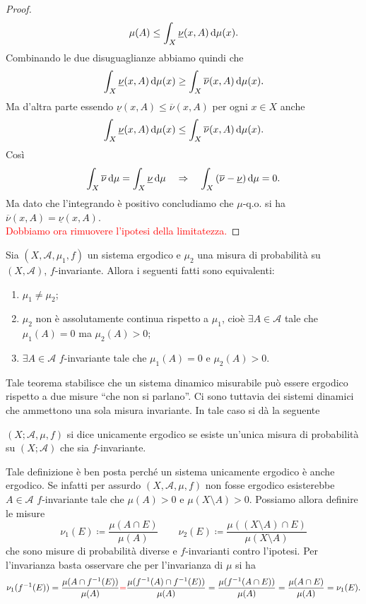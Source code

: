 \begin{proof}
    \[
        \mu(A) \leq \int_{X}\underline{\nu}(x, A) \dif{\mu}(x).
    \]
    Combinando le due disuguaglianze abbiamo quindi che
    \[
        \int_{X}\underline{\nu}(x, A) \dif{\mu}(x) \geq \int_{X}\overline{\nu}(x, A) \dif{\mu}(x).
    \]
    Ma d'altra parte essendo $ \underline{\nu}(x, A) \leq \overline{\nu}(x, A) $ per ogni $ x \in X $ anche
    \[
        \int_{X}\underline{\nu}(x, A) \dif{\mu}(x) \leq \int_{X}\overline{\nu}(x, A) \dif{\mu}(x).
    \]
    Così
    \[
        \int_{X} \overline{\nu} \dif{\mu} = \int_{X} \underline{\nu} \dif{\mu} \quad \Rightarrow \quad \int_{X} \left(\overline{\nu} - \underline{\nu}\right) \dif{\mu} = 0.
    \]
    Ma dato che l'integrando è positivo concludiamo che $ \mu $-q.o. si ha $ \overline{\nu}(x, A) = \underline{\nu}(x, A) $. \\
    \textcolor{red}{Dobbiamo ora rimuovere l'ipotesi della limitatezza.}
\end{proof}

\begin{proposition}
    Sia $ (X, \mathcal{A}, \mu_1, f) $ un sistema ergodico e $ \mu_2 $ una misura di probabilità su $ (X, \mathcal{A}) $, $ f $-invariante. Allora i seguenti fatti sono equivalenti:
    \begin{enumerate}[label=(\roman*)]
        \item $ \mu_1 \neq \mu_2 $;
        \item $ \mu_2 $ non è assolutamente continua rispetto a $ \mu_1 $, cioè $ \exists A \in \mathcal{A} $ tale che $ \mu_1(A) = 0 $ ma $ \mu_2(A) > 0 $;
        \item $ \exists A \in \mathcal{A} $ $ f $-invariante tale che $ \mu_1(A) = 0 $ e $ \mu_2(A) > 0 $.
    \end{enumerate}
\end{proposition}

Tale teorema stabilisce che un sistema dinamico misurabile può essere ergodico rispetto a due misure ``che non si parlano''. Ci sono tuttavia dei sistemi dinamici che ammettono una sola misura invariante. In tale caso si dà la seguente
\begin{definition}
    $ (X; \mathcal{A}, \mu, f) $ si dice unicamente ergodico se esiste un'unica misura di probabilità su $ (X; \mathcal{A}) $ che sia $ f $-invariante.
\end{definition}

Tale definizione è ben posta perché un sistema unicamente ergodico è anche ergodico. Se infatti per assurdo $ (X, \mathcal{A}, \mu, f) $ non fosse ergodico esisterebbe $ A \in \mathcal{A} $ $ f $-invariante tale che $ \mu(A) > 0 $ e $ \mu(X \setminus A) > 0 $. Possiamo allora definire le misure
\[
     \nu_1(E) \coloneqq \frac{\mu(A \cap E)}{\mu(A)}
     \qquad
     \nu_2(E) \coloneqq \frac{\mu((X \setminus A) \cap E)}{\mu(X \setminus A)}
\]
che sono misure di probabilità diverse e $ f $-invarianti contro l'ipotesi. Per l'invarianza basta osservare che per l'invarianza di $ \mu $ si ha
\[
    \nu_1(f^{-1}(E)) = \frac{\mu(A \cap f^{-1}(E))}{\mu(A)} \textcolor{red}{=} \frac{\mu(f^{-1}(A) \cap f^{-1}(E))}{\mu(A)} = \frac{\mu(f^{-1}(A \cap E))}{\mu(A)} = \frac{\mu(A \cap E)}{\mu(A)} = \nu_1(E).
\]

